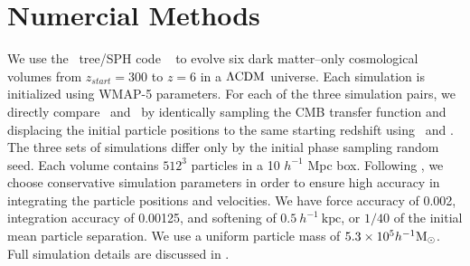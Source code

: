 
%
%

\section{Numercial Methods}
\label{sec:2lpt--methods}






We use the \nbody\ tree/SPH code \gadgettwo\ \citep{2001NewA....6...79S, 2005MNRAS.364.1105S} to evolve six dark matter--only cosmological volumes from $z_{start} = 300$ to $z = 6$ in a $\rm \Lambda CDM$ universe.  Each simulation is initialized using WMAP-5 \citep{2009ApJS..180..330K} parameters.  For each of the three simulation pairs, we directly compare \lpt\ and \za\ by identically sampling the CMB transfer function and displacing the initial particle positions to the same starting redshift using \lpt\ and \za.  The three sets of simulations differ only by the initial phase sampling random seed.  Each volume contains $512^{3}$ particles in a 10 $h^{-1}$ Mpc box.  Following \citet{2010ApJ...715..104H}, we choose conservative simulation parameters in order to ensure high accuracy in integrating the particle positions and velocities.  We have force accuracy of 0.002, integration accuracy of 0.00125, and softening of $0.5\ h^{-1}\ \mathrm{kpc}$, or $1 / 40$ of the initial mean particle separation.  We use a uniform particle mass of $5.3 \times 10^{5} h^{-1} {\rm M_\odot}$.  Full simulation details are discussed in \citet{2012ApJ...761L...8H}.

